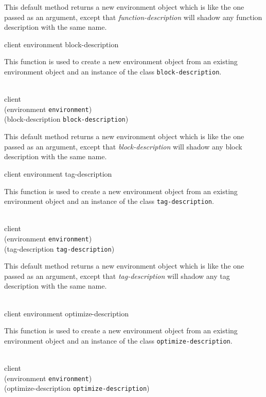 This default method returns a new environment object which is like the
one passed as an argument, except that \textit{function-description}
will shadow any function description with the same name.

{\footnotesize
{}
            {client environment block-description}
}

This function is used to create a new environment object from an
existing environment object and an instance of the class
\texttt{block-description}.

{\footnotesize
{}\\
           {client\\
            (environment {\tt environment})\\
            (block-description {\tt block-description})}
}

This default method returns a new environment object which is like the
one passed as an argument, except that \textit{block-description}
will shadow any block description with the same name.

{\footnotesize
{}
            {client environment tag-description}
}

This function is used to create a new environment object from an
existing environment object and an instance of the class
\texttt{tag-description}.

{\footnotesize
{}\\
           {client\\
            (environment {\tt environment})\\
            (tag-description {\tt tag-description})}
}

This default method returns a new environment object which is like the
one passed as an argument, except that \textit{tag-description}
will shadow any tag description with the same name.

{\footnotesize
{}\\
            {client environment optimize-description}
}

This function is used to create a new environment object from an
existing environment object and an instance of the class
\texttt{optimize-description}.

{\footnotesize
{}\\
           {client\\
            (environment {\tt environment})\\
            (optimize-description {\tt optimize-description})}
}


